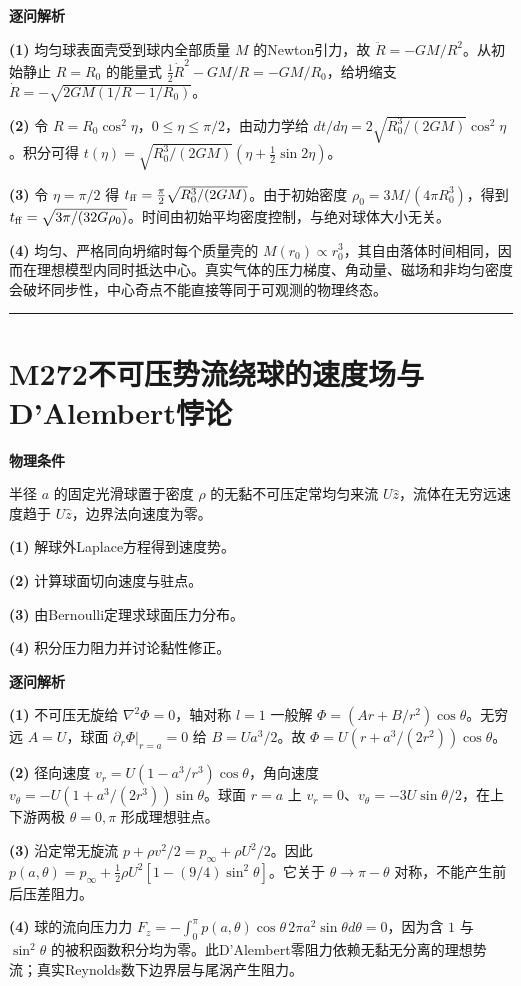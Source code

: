 \documentclass[UTF8,a4paper,11pt,oneside,openany]{ctexbook}
\begin{document}
\par\medskip\noindent\textbf{逐问解析}
\par\noindent\textbf{(1)} 均匀球表面壳受到球内全部质量 \(M\) 的Newton引力，故 \(\ddot R=-GM/R^2\)。从初始静止 \(R=R_0\) 的能量式 \(\tfrac12\dot R^2-GM/R=-GM/R_0\)，给坍缩支 \(\dot R=-\sqrt{2GM(1/R-1/R_0)}\)。
\par\noindent\textbf{(2)} 令 \(R=R_0\cos^2\eta\)，\(0\le\eta\le\pi/2\)，由动力学给 \(dt/d\eta=2\sqrt{R_0^3/(2GM)}\cos^2\eta\)。积分可得 \(t(\eta)=\sqrt{R_0^3/(2GM)}(\eta+\tfrac12\sin2\eta)\)。
\par\noindent\textbf{(3)} 令 \(\eta=\pi/2\) 得 \(t_{\rm ff}=\frac\pi2\sqrt{R_0^3/(2GM)}\)。由于初始密度 \(\rho_0=3M/(4\pi R_0^3)\)，得到 \(t_{\rm ff}=\sqrt{3\pi/(32G\rho_0)}\)。时间由初始平均密度控制，与绝对球体大小无关。
\par\noindent\textbf{(4)} 均匀、严格同向坍缩时每个质量壳的 \(M(r_0)\propto r_0^3\)，其自由落体时间相同，因而在理想模型内同时抵达中心。真实气体的压力梯度、角动量、磁场和非均匀密度会破坏同步性，中心奇点不能直接等同于可观测的物理终态。

\par\bigskip\hrule\bigskip
\section*{M272\quad 不可压势流绕球的速度场与D’Alembert悖论}
\textbf{物理条件}\par 半径 \(a\) 的固定光滑球置于密度 \(\rho\) 的无黏不可压定常均匀来流 \(U\hat z\)，流体在无穷远速度趋于 \(U\hat z\)，边界法向速度为零。
\par\noindent\textbf{(1)} 解球外Laplace方程得到速度势。
\par\noindent\textbf{(2)} 计算球面切向速度与驻点。
\par\noindent\textbf{(3)} 由Bernoulli定理求球面压力分布。
\par\noindent\textbf{(4)} 积分压力阻力并讨论黏性修正。

\par\medskip\noindent\textbf{逐问解析}
\par\noindent\textbf{(1)} 不可压无旋给 \(\nabla^2\Phi=0\)，轴对称 \(l=1\) 一般解 \(\Phi=(Ar+B/r^2)\cos\theta\)。无穷远 \(A=U\)，球面 \(\partial_r\Phi|_{r=a}=0\) 给 \(B=Ua^3/2\)。故 \(\Phi=U(r+a^3/(2r^2))\cos\theta\)。
\par\noindent\textbf{(2)} 径向速度 \(v_r=U(1-a^3/r^3)\cos\theta\)，角向速度 \(v_\theta=-U(1+a^3/(2r^3))\sin\theta\)。球面 \(r=a\) 上 \(v_r=0\)、\(v_\theta=-3U\sin\theta/2\)，在上下游两极 \(\theta=0,\pi\) 形成理想驻点。
\par\noindent\textbf{(3)} 沿定常无旋流 \(p+\rho v^2/2=p_\infty+\rho U^2/2\)。因此 \(p(a,\theta)=p_\infty+\tfrac12\rho U^2[1-(9/4)\sin^2\theta]\)。它关于 \(\theta\to\pi-\theta\) 对称，不能产生前后压差阻力。
\par\noindent\textbf{(4)} 球的流向压力力 \(F_z=-\int_0^\pi p(a,\theta)\cos\theta\,2\pi a^2\sin\theta d\theta=0\)，因为含 \(1\) 与 \(\sin^2\theta\) 的被积函数积分均为零。此D’Alembert零阻力依赖无黏无分离的理想势流；真实Reynolds数下边界层与尾涡产生阻力。
\end{document}
